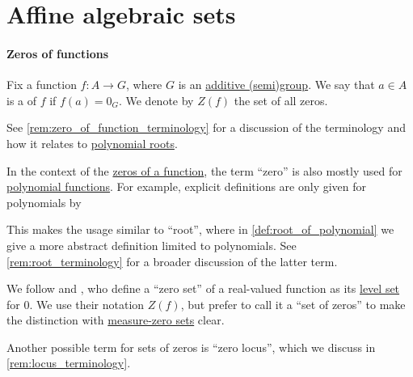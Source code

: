 \section{Affine algebraic sets}\label{sec:affine_algebraic_sets}

\paragraph{Zeros of functions}

\begin{definition}\label{def:zero_of_function}\mimprovised
  Fix a function \( f: A \to G \), where \( G \) is an \hyperref[con:additive_semigroup]{additive (semi)group}. We say that \( a \in A \) is a  of \( f \) if \( f(a) = 0_G \). We denote by \( Z(f) \) the set of all zeros.
\end{definition}
\begin{comments}
  \item See \cref{rem:zero_of_function_terminology} for a discussion of the terminology and how it relates to \hyperref[def:root_of_polynomial]{polynomial roots}.
\end{comments}

\begin{remark}\label{rem:zero_of_function_terminology}
  In the context of the \hyperref[def:zero_of_function]{zeros of a function}, the term \enquote{zero} is also mostly used for \hyperref[con:evaluation_homomorphism]{polynomial functions}. For example, explicit definitions are only given for polynomials by

  This makes the usage similar to \enquote{root}, where in \cref{def:root_of_polynomial} we give a more abstract definition limited to polynomials. See \cref{rem:root_terminology} for a broader discussion of the latter term.

  We follow  and , who define a \enquote{zero set} of a real-valued function as its \hyperref[def:level_set]{level set} for \( 0 \). We use their notation \( Z(f) \), but prefer to call it a \enquote{set of zeros} to make the distinction with \hyperref[con:measure_zero_set]{measure-zero sets} clear.

  Another possible term for sets of zeros is \enquote{zero locus}, which we discuss in \cref{rem:locus_terminology}.
\end{remark}

